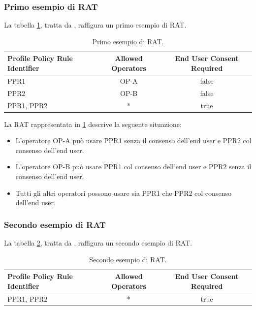 \documentclass[10pt, oneside]{book}
\begin{document}
\subsubsection{Primo esempio di RAT}
La tabella \ref{tab:rat1}, tratta da \cite{GSMA-docs-new}, raffigura un primo esempio di RAT.\\
\begin{table}[h!]
\begin{center}
\captionsetup{skip=4pt}
\caption{Primo esempio di RAT.}
\label{tab:rat1}
\begin{tabularx}{\textwidth}{|X|c|c|} %
\hline
\textbf{Profile Policy Rule Identifier} & \textbf{Allowed Operators} & \textbf{End User Consent Required}\\
\hline
PPR1 & OP-A & false\\
\hline
PPR2 & OP-B & false\\
\hline
PPR1, PPR2 & * & true\\
\hline
\end{tabularx}
\end{center}
\end{table}

\noindent La RAT rappresentata in \ref{tab:rat1} descrive la seguente situazione:
\begin{itemize}
\item L'operatore OP-A può usare PPR1 senza il consenso dell'end user e PPR2 col consenso dell'end user.
\item L'operatore OP-B può usare PPR1 col consenso dell'end user e PPR2 senza il consenso dell'end user.
\item Tutti gli altri operatori possono usare sia PPR1 che PPR2 col consenso dell'end user.
\end{itemize}

\subsubsection{Secondo esempio di RAT}
La tabella \ref{tab:rat2}, tratta da \cite{GSMA-docs-new}, raffigura un secondo esempio di RAT.\\
\begin{table}[h!]
\begin{center}
\captionsetup{skip=4pt}
\caption{Secondo esempio di RAT.}
\label{tab:rat2}
\begin{tabularx}{\textwidth}{|X|c|c|} %
\hline
\textbf{Profile Policy Rule Identifier} & \textbf{Allowed Operators} & \textbf{End User Consent Required}\\
\hline
PPR1, PPR2 & * & true\\
\hline
\end{tabularx}
\end{center}
\end{table}
\end{document}
